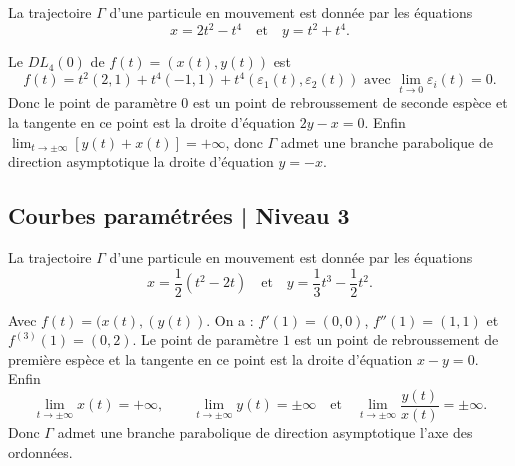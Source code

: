 \begin{question}
La trajectoire $\Gamma$ d'une particule en mouvement est donnée par les équations
$$x=2t^2-t^4\quad \mbox{et} \quad  y=t^2+t^4.$$
\begin{answers}  
\end{answers}
\begin{explanations}
Le $DL_4(0)$ de $f(t)=(x(t),y(t))$ est 
$$f(t)=t^2(2,1)+t^4(-1,1)+t^4\left(\varepsilon_1(t),\varepsilon_2(t)\right)\mbox{ avec }\lim _{t\to 0}\varepsilon_i(t)=0.$$
Donc le point de paramètre $0$ est un point de rebroussement de seconde espèce et la tangente en ce point est la droite d'équation $2y-x=0$. Enfin $\displaystyle \lim _{t\to \pm \infty}[y(t)+x(t)]=+\infty$, donc $\Gamma$ admet une branche parabolique de direction asymptotique la droite d'équation $y=-x$.
\end{explanations}
\end{question}

\subsection{Courbes paramétrées | Niveau 3}

\begin{question}
La trajectoire $\Gamma$ d'une particule en mouvement est donnée par les équations
$$x=\frac{1}{2}(t^2-2t)\quad \mbox{et} \quad  y=\frac{1}{3}t^{3}-\frac{1}{2}t^2.$$
\begin{answers}  
\end{answers}
\begin{explanations}
Avec $f(t)=(x(t),(y(t))$. On a : $f'(1)=(0,0)$, $f''(1)=(1,1)$ et $f^{(3)}(1)=(0,2)$. Le point de paramètre $1$ est un point de rebroussement de première espèce et la tangente en ce point est la droite d'équation $x-y=0$. Enfin 
$$\displaystyle \lim _{t\to \pm \infty}x(t)
=+\infty,\qquad \lim _{t\to \pm \infty}y(t)=\pm\infty\quad\mbox{et}\quad \lim _{t\to \pm \infty}\frac{y(t)}{x(t)}=\pm\infty .$$
Donc $\Gamma$ admet une branche parabolique de direction asymptotique l'axe des ordonnées.
\end{explanations}
\end{question}

